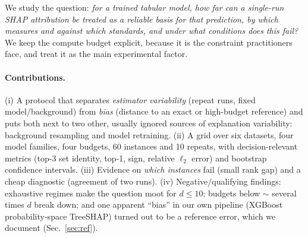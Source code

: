 \documentclass{article}
\begin{document}
We study the question: \emph{for a trained tabular model, how far can a single-run SHAP attribution be treated as a reliable basis for that prediction, by which measures and against which standards, and under what conditions does this fail?} We keep the compute budget explicit, because it is the constraint practitioners face, and treat it as the main experimental factor.

\paragraph{Contributions.} (i) A protocol that separates \emph{estimator variability} (repeat runs, fixed model/background) from \emph{bias} (distance to an exact or high-budget reference) and puts both next to two other, usually ignored sources of explanation variability: background resampling and model retraining. (ii) A grid over six datasets, four model families, four budgets, 60 instances and 10 repeats, with decision-relevant metrics (top-3 set identity, top-1, sign, relative $\ell_2$ error) and bootstrap confidence intervals. (iii) Evidence on \emph{which instances} fail (small rank gap) and a cheap diagnostic (agreement of two runs). (iv) Negative/qualifying findings: exhaustive regimes make the question moot for $d\le10$; budgets below $\sim$ several times $d$ break down; and one apparent ``bias'' in our own pipeline (XGBoost probability-space TreeSHAP) turned out to be a reference error, which we document (Sec.~\ref{sec:ref}).
\end{document}
